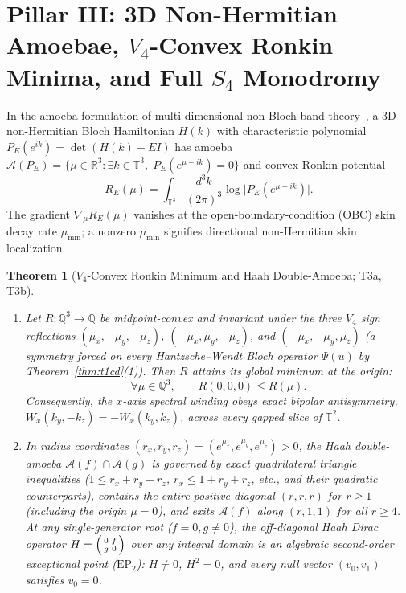 \documentclass[11pt,reqno]{amsart}
\newtheorem{theorem}{Theorem}[section]
\theoremstyle{definition}
\newcommand{\Q}{\mathbb{Q}}
\newcommand{\R}{\mathbb{R}}
\newcommand{\T}{\mathbb{T}}
\newcommand{\A}{\mathcal{A}}
\begin{document}
\section{Pillar III: 3D Non-Hermitian Amoebae, $V_4$-Convex Ronkin Minima, and Full $S_4$ Monodromy}
\label{sec:pillar3}

In the amoeba formulation of multi-dimensional non-Bloch band theory~\cite{passare2004amoebas,wang2024amoeba},
a $3$D non-Hermitian Bloch Hamiltonian $H(k)$ with characteristic polynomial $P_E(e^{ik}) = \det(H(k) - E I)$
has amoeba $\A(P_E) = \{ \mu \in \R^3 : \exists k \in \T^3,\; P_E(e^{\mu + ik}) = 0 \}$ and convex
Ronkin potential
\[
  R_E(\mu) = \int_{\T^3} \frac{d^3k}{(2\pi)^3} \log \bigl| P_E(e^{\mu + ik}) \bigr|.
\]
The gradient $\nabla_\mu R_E(\mu)$ vanishes at the open-boundary-condition (OBC) skin decay rate
$\mu_{\min}$; a nonzero $\mu_{\min}$ signifies directional non-Hermitian skin localization.

\begin{theorem}[$V_4$-Convex Ronkin Minimum and Haah Double-Amoeba; \textsf{T3a}, \textsf{T3b}]
\label{thm:t3ab}
\leavevmode
\begin{enumerate}[leftmargin=2em]
  \item Let $R : \Q^3 \to \Q$ be midpoint-convex and invariant under the three $V_4$ sign reflections
    $(\mu_x,-\mu_y,-\mu_z)$, $(-\mu_x,\mu_y,-\mu_z)$, and $(-\mu_x,-\mu_y,\mu_z)$ (a symmetry forced
    on every Hantzsche--Wendt Bloch operator $\Psi(u)$ by Theorem~\ref{thm:t1cd}(1)). Then $R$
    attains its global minimum at the origin:
    \[
      \forall \mu \in \Q^3, \qquad R(0,0,0) \le R(\mu).
    \]
    Consequently, the $x$-axis spectral winding obeys exact bipolar antisymmetry,
    $W_x(k_y, -k_z) = -W_x(k_y, k_z)$, across every gapped slice of $\T^2$.
  \item In radius coordinates $(r_x, r_y, r_z) = (e^{\mu_x}, e^{\mu_y}, e^{\mu_z}) > 0$, the Haah
    double-amoeba $\A(f) \cap \A(g)$ is governed by exact quadrilateral triangle inequalities
    ($1 \le r_x + r_y + r_z$, $r_x \le 1 + r_y + r_z$, etc., and their quadratic counterparts),
    contains the entire positive diagonal $(r,r,r)$ for $r \ge 1$ (including the origin $\mu = 0$),
    and exits $\A(f)$ along $(r,1,1)$ for all $r \ge 4$. At any single-generator root ($f=0, g \neq 0$),
    the off-diagonal Haah Dirac operator $H = \begin{psmallmatrix} 0 & f \\ g & 0 \end{psmallmatrix}$
    over any integral domain is an algebraic second-order exceptional point ($\mathrm{EP}_2$):
    $H \neq 0$, $H^2 = 0$, and every null vector $(v_0, v_1)$ satisfies $v_0 = 0$.
\end{enumerate}
\end{theorem}
\end{document}
